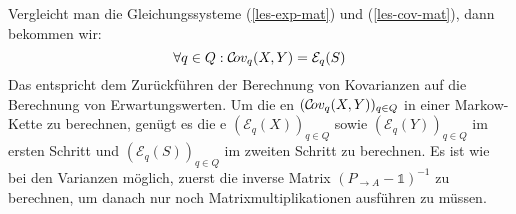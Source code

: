 \documentclass[a4paper]{article}
\newcommand{\mc}{Markow-Kette}
\theoremstyle{nonumberplain}
\begin{document}
	Vergleicht man die Gleichungssysteme (\ref{les-exp-mat}) und (\ref{les-cov-mat}), dann bekommen wir:
	\begin{equation}
	\forall q \in Q : \mathcal{C}\!ov_q(X,Y) = \mathcal{E}_q(S)
	\end{equation}
	Das entspricht dem Zurückführen der Berechnung von Kovarianzen auf die Berechnung von Erwartungswerten. Um die \cov{}en $(\mathcal{C}\!ov_q(X,Y))_{q\in Q}$ in einer \mc{} zu berechnen, genügt es die \expect{}e $(\mathcal{E}_q(X))_{q\in Q}$ sowie $(\mathcal{E}_q(Y))_{q\in Q}$ im ersten Schritt und $(\mathcal{E}_q(S))_{q\in Q}$ im zweiten Schritt zu berechnen. Es ist wie bei den Varianzen möglich, zuerst die inverse Matrix $(P_{\rightarrow A} - \mathbb{1})^{-1}$ zu berechnen, um danach nur noch Matrixmultiplikationen ausführen zu müssen.
	
\end{document}
